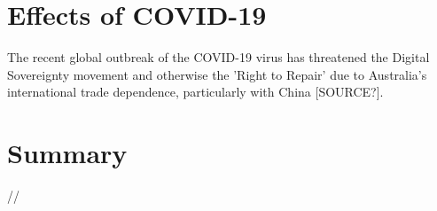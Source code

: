 
\section{Effects of COVID-19}
The recent global outbreak of the COVID-19 virus has threatened the Digital Sovereignty movement and otherwise the 'Right to Repair' due to Australia's international trade dependence, particularly with China [SOURCE?].


\section{Summary}
//



